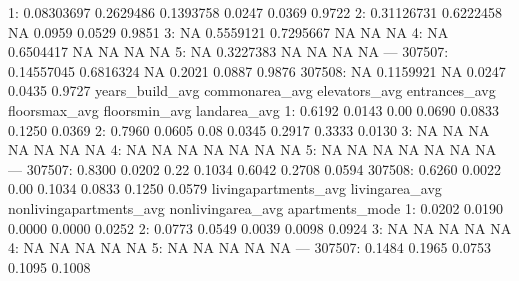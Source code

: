 \documentclass[a4paper]{article}
\begin{document}
\begin{Schunk}
\begin{Soutput}
     1:   0.08303697    0.2629486    0.1393758         0.0247           0.0369                      0.9722
     2:   0.31126731    0.6222458           NA         0.0959           0.0529                      0.9851
     3:           NA    0.5559121    0.7295667             NA               NA                          NA
     4:           NA    0.6504417           NA             NA               NA                          NA
     5:           NA    0.3227383           NA             NA               NA                          NA
    ---                                                                                                   
307507:   0.14557045    0.6816324           NA         0.2021           0.0887                      0.9876
307508:           NA    0.1159921           NA         0.0247           0.0435                      0.9727
        years_build_avg commonarea_avg elevators_avg entrances_avg floorsmax_avg floorsmin_avg landarea_avg
     1:          0.6192         0.0143          0.00        0.0690        0.0833        0.1250       0.0369
     2:          0.7960         0.0605          0.08        0.0345        0.2917        0.3333       0.0130
     3:              NA             NA            NA            NA            NA            NA           NA
     4:              NA             NA            NA            NA            NA            NA           NA
     5:              NA             NA            NA            NA            NA            NA           NA
    ---                                                                                                    
307507:          0.8300         0.0202          0.22        0.1034        0.6042        0.2708       0.0594
307508:          0.6260         0.0022          0.00        0.1034        0.0833        0.1250       0.0579
        livingapartments_avg livingarea_avg nonlivingapartments_avg nonlivingarea_avg apartments_mode
     1:               0.0202         0.0190                  0.0000            0.0000          0.0252
     2:               0.0773         0.0549                  0.0039            0.0098          0.0924
     3:                   NA             NA                      NA                NA              NA
     4:                   NA             NA                      NA                NA              NA
     5:                   NA             NA                      NA                NA              NA
    ---                                                                                              
307507:               0.1484         0.1965                  0.0753            0.1095          0.1008

\end{Soutput}
\end{Schunk}
\end{document}
